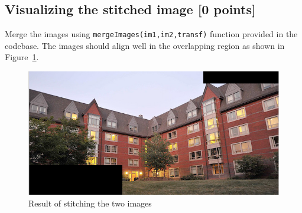 \documentclass[10pt,letterpaper]{article}
\newcommand{\cmd}[1] {{\color{blue}\texttt{#1}}}
\begin{document}
\vspace{-0.1in}
\subsection{Visualizing the stitched image [0 points]}
Merge the images using \cmd{mergeImages(im1,im2,transf)} function provided in the codebase. The images should align well in the overlapping region as shown in Figure~\ref{fig:result}.

\begin{figure}[h]
\centering
\includegraphics[width=0.88\linewidth]{result.png}
\vspace{-0.1in}
\caption{\label{fig:result}Result of stitching the two 
images}
\vspace{-0.1in}
\end{figure}
\end{document}

